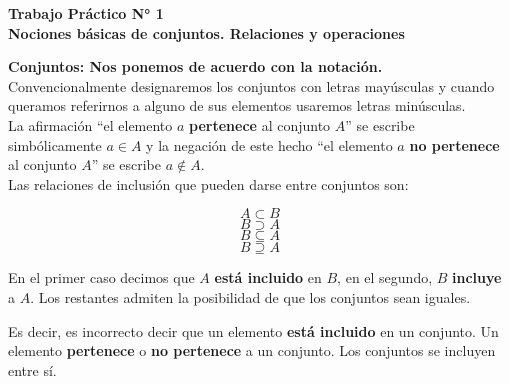 \documentclass[12pt]{article}
\theoremstyle{definition}
\begin{document}
\fancyhf{}
\pagestyle{fancy}


\begin{centering}
\Large{\textbf{Trabajo Práctico N° 1}}\\
\large{\textbf{Nociones básicas de conjuntos. Relaciones y operaciones}}\\
\end{centering}

\vspace{1cm}
\noindent
\textbf{Conjuntos: Nos ponemos de acuerdo con la notación.}\\
\noindent
Convencionalmente designaremos los conjuntos con letras mayúsculas y cuando queramos referirnos a alguno de sus elementos usaremos letras minúsculas. \\
La afirmación “el elemento $a$ \textbf{pertenece} al conjunto $A$” se escribe simbólicamente $a \in A$ y la negación de este hecho “el elemento $a$ \textbf{no pertenece} al conjunto $A$” se escribe $a \not \in A$.   \\
Las relaciones de inclusión que pueden darse entre conjuntos son: 
\begin{multicols}{4}
\noindent
\[ A \subset B \]
\[ B \supset A \]
\[ B \subseteq A \]
\[ B \supseteq A \]
\end{multicols}
En el primer caso decimos que  $A$ \textbf{está incluido} en $B$, en el segundo,  $B$ \textbf{incluye} a $A$. Los restantes admiten la posibilidad de que los conjuntos sean iguales.

\vspace{1cm}


\vspace{1cm}
\noindent
Es decir, es incorrecto decir que un elemento \textbf{está incluido} en un conjunto. Un elemento \textbf{pertenece} o \textbf{no pertenece} a un conjunto. Los conjuntos se incluyen entre sí.\\
\end{document}
